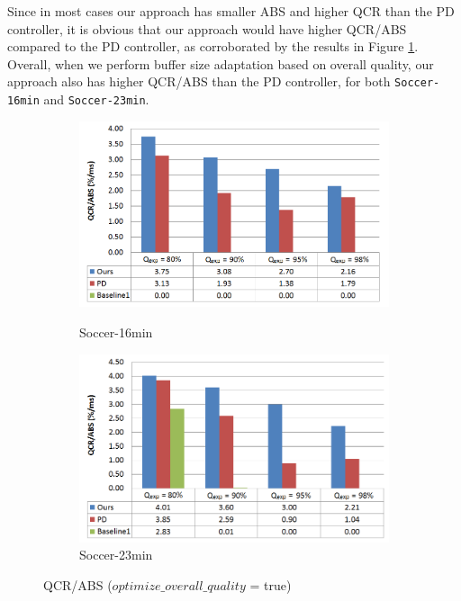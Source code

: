 \documentclass[a4paper, 11pt, twoside]{report}
\begin{document}
Since in most cases our approach has smaller ABS and higher QCR than the PD controller, it is obvious that our approach would have higher QCR/ABS compared to the PD controller, as corroborated by the results in Figure \ref{fig:qcr/abs-overallquality}. Overall, when we perform buffer size adaptation based on overall quality, our approach also has higher QCR/ABS than the PD controller, for both \texttt{Soccer-16min} and \texttt{Soccer-23min}.\\

\begin{figure}[H]
	\centering
	\begin{subfigure}[t]{5in}
		\centering
		\includegraphics[width=5in]{QCR_ABS-16min-overallquality}
		\caption{Soccer-16min}
		\hspace{5pt}
		\includegraphics[width=5in]{QCR_ABS-23min-overallquality}
		\caption{Soccer-23min}	
	\end{subfigure}
	\caption{QCR/ABS ($optimize\_overall\_quality$ = true)}
	\label{fig:qcr/abs-overallquality}
\end{figure}
\end{document}

